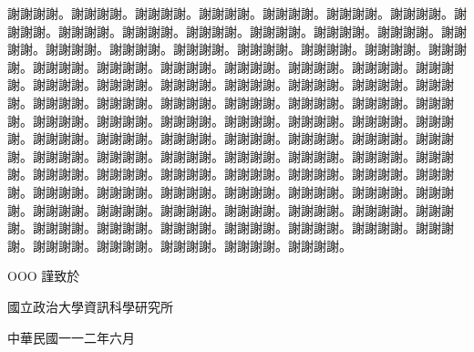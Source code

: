 \begin{acknowledgementszh}
謝謝謝謝。謝謝謝謝。謝謝謝謝。謝謝謝謝。謝謝謝謝。謝謝謝謝。謝謝謝謝。謝謝謝謝。謝謝謝謝。謝謝謝謝。謝謝謝謝。謝謝謝謝。謝謝謝謝。謝謝謝謝。謝謝謝謝。謝謝謝謝。謝謝謝謝。謝謝謝謝。謝謝謝謝。謝謝謝謝。謝謝謝謝。謝謝謝謝。謝謝謝謝。謝謝謝謝。謝謝謝謝。謝謝謝謝。謝謝謝謝。謝謝謝謝。謝謝謝謝。謝謝謝謝。謝謝謝謝。謝謝謝謝。謝謝謝謝。謝謝謝謝。謝謝謝謝。謝謝謝謝。謝謝謝謝。謝謝謝謝。謝謝謝謝。謝謝謝謝。謝謝謝謝。謝謝謝謝。謝謝謝謝。謝謝謝謝。謝謝謝謝。謝謝謝謝。謝謝謝謝。謝謝謝謝。謝謝謝謝。謝謝謝謝。謝謝謝謝。謝謝謝謝。謝謝謝謝。謝謝謝謝。謝謝謝謝。謝謝謝謝。謝謝謝謝。謝謝謝謝。謝謝謝謝。謝謝謝謝。謝謝謝謝。謝謝謝謝。謝謝謝謝。謝謝謝謝。謝謝謝謝。謝謝謝謝。謝謝謝謝。謝謝謝謝。謝謝謝謝。謝謝謝謝。謝謝謝謝。謝謝謝謝。謝謝謝謝。謝謝謝謝。謝謝謝謝。謝謝謝謝。謝謝謝謝。謝謝謝謝。謝謝謝謝。謝謝謝謝。謝謝謝謝。謝謝謝謝。謝謝謝謝。謝謝謝謝。謝謝謝謝。謝謝謝謝。謝謝謝謝。謝謝謝謝。謝謝謝謝。謝謝謝謝。謝謝謝謝。謝謝謝謝。謝謝謝謝。謝謝謝謝。謝謝謝謝。謝謝謝謝。謝謝謝謝。\par


\begin{flushright}
OOO  \qquad 謹致於\par

國立政治大學資訊科學研究所\par

中華民國一一二年六月\par

\end{flushright}

\end{acknowledgementszh}


